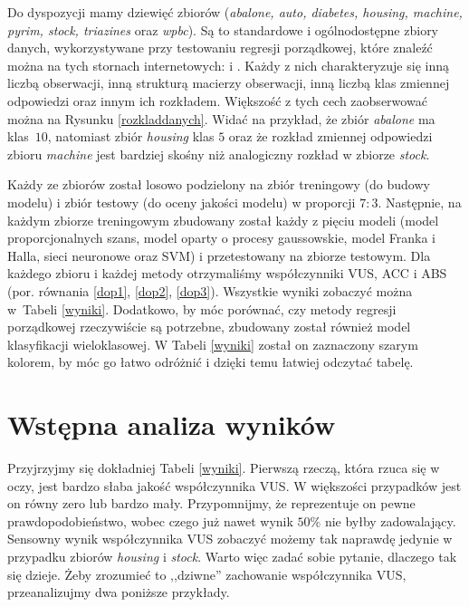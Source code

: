 \documentclass{mini}
\begin{document}
Do dyspozycji mamy dziewięć zbiorów (\textit{abalone, auto, diabetes, housing, machine, pyrim, stock, triazines} oraz \textit{wpbc}). Są to standardowe i ogólnodostępne zbiory danych, wykorzystywane przy testowaniu regresji porządkowej, które znaleźć można na tych stornach internetowych: \cite{zbiorki} i \cite{zbiorki2}. Każdy z nich charakteryzuje się inną liczbą obserwacji, inną strukturą macierzy obserwacji, inną liczbą klas zmiennej odpowiedzi oraz innym ich rozkładem. Większość z tych cech zaobserwować można na Rysunku \ref{rozkladdanych}. Widać na przykład, że zbiór \textit{abalone} ma klas~$10$, natomiast zbiór \textit{housing} klas $5$ oraz że rozkład zmiennej odpowiedzi zbioru \textit{machine} jest bardziej skośny niż analogiczny rozkład w zbiorze \textit{stock}. 

Każdy ze zbiorów został losowo podzielony na zbiór treningowy (do budowy modelu) i zbiór testowy (do oceny jakości modelu) w proporcji $7:3$. Następnie, na każdym zbiorze treningowym zbudowany został każdy z pięciu modeli (model proporcjonalnych szans, model oparty o procesy gaussowskie, model Franka i Halla, sieci neuronowe oraz SVM) i przetestowany na zbiorze testowym. Dla każdego zbioru i każdej metody otrzymaliśmy współczynniki VUS, ACC i ABS (por. równania \eqref{dop1}, \eqref{dop2}, \eqref{dop3}). Wszystkie wyniki zobaczyć można w~Tabeli \ref{wyniki}. Dodatkowo, by móc porównać, czy metody regresji porządkowej rzeczywiście są potrzebne, zbudowany został również model klasyfikacji wieloklasowej. W Tabeli \ref{wyniki} został on zaznaczony szarym kolorem, by móc go łatwo odróżnić i dzięki temu łatwiej odczytać tabelę.

\section{Wstępna analiza wyników}

Przyjrzyjmy się dokładniej Tabeli \ref{wyniki}. Pierwszą rzeczą, która rzuca się w oczy, jest bardzo słaba jakość współczynnika VUS. W większości przypadków jest on równy zero lub bardzo mały. Przypomnijmy, że reprezentuje on pewne prawdopodobieństwo, wobec czego już nawet wynik $50\%$ nie byłby zadowalający. Sensowny wynik współczynnika VUS zobaczyć możemy tak naprawdę jedynie w przypadku zbiorów \textit{housing} i \textit{stock}. Warto więc zadać sobie pytanie, dlaczego tak się dzieje.  Żeby zrozumieć to ,,dziwne'' zachowanie współczynnika VUS, przeanalizujmy dwa poniższe przykłady.
\end{document}
